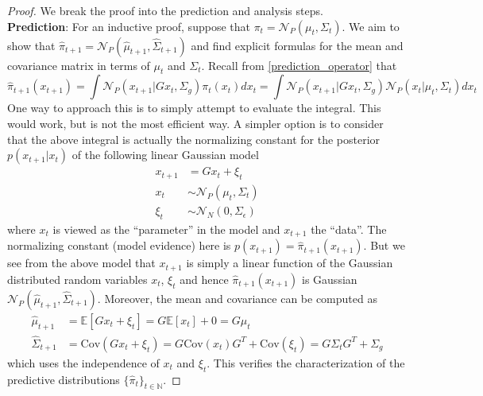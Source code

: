 \documentclass[12pt]{article}
\newcommand{\E}{\mathbb{E}}
\newcommand{\Cov}{\mathrm{Cov}}
\begin{document}
\begin{proof} 
We break the proof into the prediction and analysis steps. \\

\noindent
\textbf{Prediction}: For an inductive proof, suppose that $\pi_t = \mathcal{N}_P(\mu_t, \Sigma_t)$. We aim to show that 
$\hat{\pi}_{t + 1} = \mathcal{N}_P(\hat{\mu}_{t + 1}, \hat{\Sigma}_{t + 1})$ and find explicit formulas for the mean and covariance 
matrix in terms of $\mu_t$ and $\Sigma_t$. Recall from \ref{prediction_operator} that 
\[\hat{\pi}_{t + 1}(x_{t+1}) = \int \mathcal{N}_P(x_{t+1}|Gx_t, \Sigma_g) \pi_t(x_t) dx_t = \int \mathcal{N}_P(x_{t+1}|Gx_t, \Sigma_g) \mathcal{N}_P(x_{t}|\mu_t, \Sigma_t) dx_t \]
One way to approach this is to simply attempt to evaluate the integral. This would work, but is not the most efficient way. A simpler option 
is to consider that the above integral is actually the normalizing constant for the posterior $p(x_{t+1}|x_t)$ of the following linear Gaussian model 
\begin{align*}
x_{t + 1} &= Gx_t + \xi_t \\
x_t &\sim \mathcal{N}_P(\mu_t, \Sigma_t) \\
\xi_t &\sim \mathcal{N}_N(0, \Sigma_\epsilon)
\end{align*}
where $x_t$ is viewed as the ``parameter'' in the model and $x_{t+1}$ the ``data''. The normalizing constant (model evidence) here is 
$p(x_{t + 1}) = \hat{\pi}_{t + 1}(x_{t+1})$. But we see from the above model that $x_{t + 1}$ is simply a linear function of the Gaussian distributed 
random variables $x_t$, $\xi_t$ and hence $\hat{\pi}_{t + 1}(x_{t+1})$ is Gaussian $\mathcal{N}_P(\hat{\mu}_{t + 1}, \hat{\Sigma}_{t + 1})$. 
Moreover, the mean and covariance can be computed as 
\begin{align*}
\hat{\mu}_{t + 1} &= \E\left[Gx_t + \xi_t\right] = G\E[x_t] + 0 = G \mu_t \\
\hat{\Sigma}_{t + 1} &= \Cov(Gx_t + \xi_t) = G \Cov(x_t) G^T + \Cov(\xi_t) = G \Sigma_t G^T + \Sigma_{g}
\end{align*}
which uses the independence of $x_t$ and $\xi_t$. This verifies the characterization of the predictive distributions $\{\hat{\pi}_t\}_{t \in \mathbb{N}}$. 


\end{proof}
\end{document}
